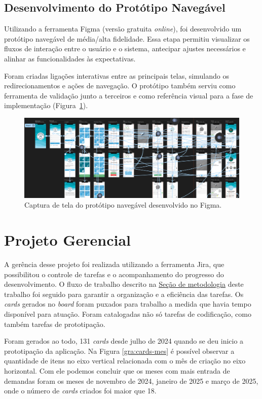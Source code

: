 \subsection{Desenvolvimento do Protótipo Navegável}

Utilizando a ferramenta Figma (versão gratuita \textit{online}), foi desenvolvido um
protótipo navegável de média/alta fidelidade. Essa etapa permitiu visualizar os fluxos de 
interação entre o usuário e o sistema, antecipar ajustes necessários e alinhar as funcionalidades 
às expectativas.

Foram criadas ligações interativas entre as principais telas, simulando os redirecionamentos e 
ações de navegação. O protótipo também serviu como ferramenta de validação junto a terceiros e 
como referência visual para a fase de implementação (Figura~\ref{fig:prototipo-fluxo-navegacao}).

\begin{figure}[H]
    \centering
    \includegraphics[width=\textwidth]{imagens/prototipo-navegavel-figma.png}
    \caption{Captura de tela do protótipo navegável desenvolvido no Figma.}
    \label{fig:prototipo-fluxo-navegacao}
\end{figure}

\section{Projeto Gerencial}
A gerência desse projeto foi realizada utilizando a ferramenta Jira, que possibilitou o
controle de tarefas e o acompanhamento do progresso do desenvolvimento. O fluxo de trabalho
descrito na \hyperref[sec:metodologia-desenv-software]{Seção de metodologia} deste trabalho foi 
seguido para garantir a organização e a eficiência
das tarefas. Os \textit{cards} gerados no \textit{board} foram puxados para trabalho a medida que 
havia tempo disponível para atuação. Foram catalogadas não só tarefas de codificação, como 
também tarefas de prototipação.

Foram gerados ao todo, 131 \textit{cards} desde julho de 2024 quando se deu inicio a prototipação 
da aplicação. Na Figura \ref{gra:cards-mes} é possível observar a quantidade de itens no eixo vertical
relacionada com o mês de criação no eixo horizontal. Com ele podemos concluir que os meses com 
mais entrada de demandas foram os meses de novembro de 2024, janeiro de 2025 e março de 2025,
onde o número de \textit{cards} criados foi maior que 18.

